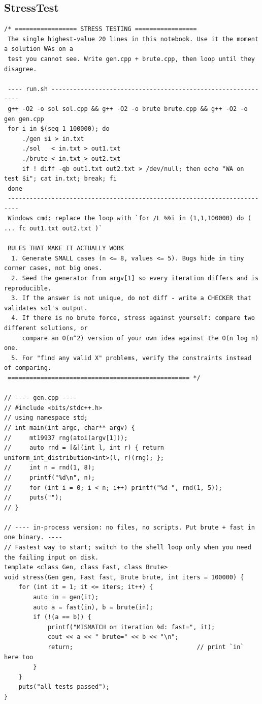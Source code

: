 \documentclass[9pt,a4paper,twocolumn]{extarticle}
\begin{document}
\subsection{StressTest}
\nopagebreak
\begin{lstlisting}
/* ================= STRESS TESTING =================
 The single highest-value 20 lines in this notebook. Use it the moment a solution WAs on a
 test you cannot see. Write gen.cpp + brute.cpp, then loop until they disagree.

 ---- run.sh -------------------------------------------------------------
 g++ -O2 -o sol sol.cpp && g++ -O2 -o brute brute.cpp && g++ -O2 -o gen gen.cpp
 for i in $(seq 1 100000); do
     ./gen $i > in.txt
     ./sol   < in.txt > out1.txt
     ./brute < in.txt > out2.txt
     if ! diff -qb out1.txt out2.txt > /dev/null; then echo "WA on test $i"; cat in.txt; break; fi
 done
 -------------------------------------------------------------------------
 Windows cmd: replace the loop with `for /L %%i in (1,1,100000) do ( ... fc out1.txt out2.txt )`

 RULES THAT MAKE IT ACTUALLY WORK
  1. Generate SMALL cases (n <= 8, values <= 5). Bugs hide in tiny corner cases, not big ones.
  2. Seed the generator from argv[1] so every iteration differs and is reproducible.
  3. If the answer is not unique, do not diff - write a CHECKER that validates sol's output.
  4. If there is no brute force, stress against yourself: compare two different solutions, or
     compare an O(n^2) version of your own idea against the O(n log n) one.
  5. For "find any valid X" problems, verify the constraints instead of comparing.
 ================================================== */

// ---- gen.cpp ----
// #include <bits/stdc++.h>
// using namespace std;
// int main(int argc, char** argv) {
//     mt19937 rng(atoi(argv[1]));
//     auto rnd = [&](int l, int r) { return uniform_int_distribution<int>(l, r)(rng); };
//     int n = rnd(1, 8);
//     printf("%d\n", n);
//     for (int i = 0; i < n; i++) printf("%d ", rnd(1, 5));
//     puts("");
// }

// ---- in-process version: no files, no scripts. Put brute + fast in one binary. ----
// Fastest way to start; switch to the shell loop only when you need the failing input on disk.
template <class Gen, class Fast, class Brute>
void stress(Gen gen, Fast fast, Brute brute, int iters = 100000) {
    for (int it = 1; it <= iters; it++) {
        auto in = gen(it);
        auto a = fast(in), b = brute(in);
        if (!(a == b)) {
            printf("MISMATCH on iteration %d: fast=", it);
            cout << a << " brute=" << b << "\n";
            return;                                  // print `in` here too
        }
    }
    puts("all tests passed");
}
\end{lstlisting}
\end{document}
